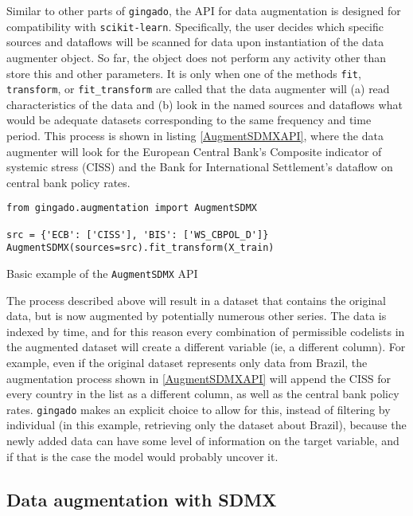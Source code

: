 \documentclass{article}
\begin{document}
Similar to other parts of \texttt{gingado}, the API for data augmentation is designed for compatibility with \texttt{scikit-learn}. Specifically, the user decides which specific sources and dataflows will be scanned for data upon instantiation of the data augmenter object. So far, the object does not perform any activity other than store this and other parameters. It is only when one of the methods \texttt{fit}, \texttt{transform}, or \texttt{fit\_transform} are called that the data augmenter will (a) read characteristics of the data and (b) look in the named sources and dataflows what would be adequate datasets corresponding to the same frequency and time period. This process is shown in listing \ref{AugmentSDMXAPI}, where the data augmenter will look for the European Central Bank's Composite indicator of systemic stress (CISS) and the Bank for International Settlement's dataflow on central bank policy rates.


\begin{listing}[h]
\begin{verbatim}
from gingado.augmentation import AugmentSDMX

src = {'ECB': ['CISS'], 'BIS': ['WS_CBPOL_D']}
AugmentSDMX(sources=src).fit_transform(X_train)
\end{verbatim} 
\caption{Basic example of the \texttt{AugmentSDMX} API}
\label{AugmentSDMXAPI}
\end{listing}

The process described above will result in a dataset that contains the original data, but is now augmented by potentially numerous other series. The data is indexed by time, and for this reason every combination of permissible codelists in the augmented dataset will create a different variable (ie, a different column). For example, even if the original dataset represents only data from Brazil, the augmentation process shown in \ref{AugmentSDMXAPI} will append the CISS for every country in the list as a different column, as well as the central bank policy rates. \texttt{gingado} makes an explicit choice to allow for this, instead of filtering by individual (in this example, retrieving only the dataset about Brazil), because the newly added data can have some level of information on the target variable, and if that is the case the model would probably uncover it. 

\subsection{Data augmentation with SDMX}\label{AugmSDMX}
\end{document}
